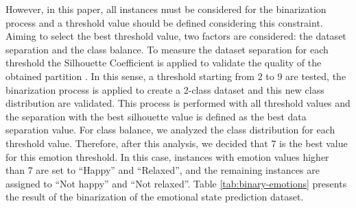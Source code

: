 \documentclass[conference]{IEEEtran}
\begin{document}
However, in this paper, all instances must be considered for the binarization process and a  threshold value should be defined considering this constraint. Aiming to select the best threshold value, two factors are considered: the dataset separation and the class balance. To measure the dataset separation for each threshold the Silhouette Coefficient is applied to validate the quality of the obtained partition \cite{silhouettes}. In this sense, a threshold starting from 2 to 9 are tested, the binarization process is applied to create a 2-class dataset and this new class distribution are validated. This process is performed with all threshold values and the separation with the best silhouette value is defined as the best data separation value. For class balance, we analyzed the class distribution for each threshold value. Therefore, after this analysis, we decided that 7 is the best value for this emotion threshold. In this case, instances with emotion values higher than 7 are set to ``Happy'' and ``Relaxed'', and the remaining instances are assigned to ``Not happy'' and ``Not relaxed''. Table \ref{tab:binary-emotions} presents the result of the binarization of the emotional state prediction dataset.
\end{document}

